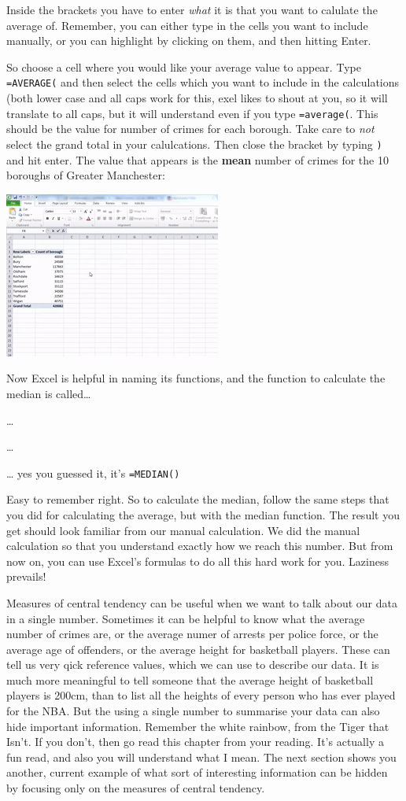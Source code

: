 \documentclass[]{book}
\theoremstyle{definition}
\theoremstyle{definition}
\theoremstyle{definition}
\theoremstyle{remark}
\begin{document}
Inside the brackets you have to enter \emph{what} it is that you want to
calulate the average of. Remember, you can either type in the cells you
want to include manually, or you can highlight by clicking on them, and
then hitting Enter.

So choose a cell where you would like your average value to appear. Type
\texttt{=AVERAGE(} and then select the cells which you want to include
in the calculations (both lower case and all caps work for this, exel
likes to shout at you, so it will translate to all caps, but it will
understand even if you type \texttt{=average(}. This should be the value
for number of crimes for each borough. Take care to \emph{not} select
the grand total in your calulcations. Then close the bracket by typing
\texttt{)} and hit enter. The value that appears is the \textbf{mean}
number of crimes for the 10 boroughs of Greater Manchester:

\includegraphics{imgs/calc_avg.gif}

Now Excel is helpful in naming its functions, and the function to
calculate the median is called\ldots{}

\ldots{}

\ldots{}

\ldots{} yes you guessed it, it's \texttt{=MEDIAN()}

Easy to remember right. So to calculate the median, follow the same
steps that you did for calculating the average, but with the median
function. The result you get should look familiar from our manual
calculation. We did the manual calculation so that you understand
exactly how we reach this number. But from now on, you can use Excel's
formulas to do all this hard work for you. Laziness prevails!

Measures of central tendency can be useful when we want to talk about
our data in a single number. Sometimes it can be helpful to know what
the average number of crimes are, or the average numer of arrests per
police force, or the average age of offenders, or the average height for
basketball players. These can tell us very qick reference values, which
we can use to describe our data. It is much more meaningful to tell
someone that the average height of basketball players is 200cm, than to
list all the heights of every person who has ever played for the NBA.
But the using a single number to summarise your data can also hide
important information. Remember the white rainbow, from the Tiger that
Isn't. If you don't, then go read this chapter from your reading. It's
actually a fun read, and also you will understand what I mean. The next
section shows you another, current example of what sort of interesting
information can be hidden by focusing only on the measures of central
tendency.
\end{document}
